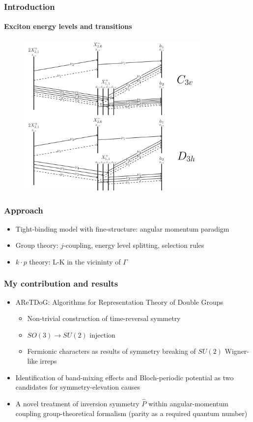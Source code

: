 \documentclass[english]{beamer}
\begin{document}
	\begin{frame}
		\frametitle{Introduction}
		\framesubtitle{Exciton energy levels and transitions}
		\begin{figure}
	\centering
    		\includegraphics[width=0.85\textwidth]{images/2X21_scheme}
    		\label{fig:qd}
	\end{figure}
		
	
	
	\end{frame}
  
  \begin{frame}
  	\frametitle{Approach}
  	\begin{itemize}
  		\item Tight-binding model with fine-structure: angular momentum paradigm
  		\item Group theory: $j$-coupling, energy level splitting, selection rules
  		\item $k\cdot p$ theory: L-K in the vicininty of $\Gamma$
  	\end{itemize}
  \end{frame}
  
  \begin{frame}
  	\frametitle{My contribution and results}
  	\begin{itemize}
  		\item AReTDoG: Algorithms for Representation Theory of Double Groups
		\begin{itemize}		  		
  			\item Non-trivial construction of time-reversal symmetry
  			\item $SO(3)\to SU(2)$ injection
  			\item Fermionic characters as results of symmetry breaking of $SU(2)$ Wigner-like irreps
		\end{itemize}
  		\item Identification of band-mixing effects and Bloch-periodic potential as two candidates for symmetry-elevation causes
  		\item A novel treatment of inversion symmetry $\hat{P}$ within angular-momentum coupling group-theoretical formalism (parity as a required quantum number)
  		
  		
  	\end{itemize}
  \end{frame}
  
\end{document}

